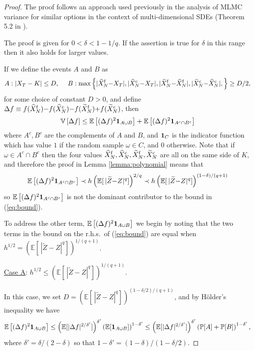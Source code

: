 \documentclass[11pt]{article}
\def \EE {{\mathbb{E}}}
\def \VV {{\mathbb{V}}}
\def \PP {{\mathbb{P}}}
\def \one {{\bf 1}}
\def \tZ {{\widetilde{Z}}}
\def \tXf  {{\widetilde{X}^{\rm f}}}
\def \tXc  {{\widetilde{X}^{\rm c}}}
\def \hXf {{\widehat{X}^{\rm f}}}
\def \hXc {{\widehat{X}^{\rm c}}}
\begin{document}
\begin{proof}
The proof follows an approach used previously in the analysis of MLMC variance
for similar options in the context of multi-dimensional SDEs (Theorem 5.2 in \cite{gs14}).

The proof is given for $0\!<\!\delta\!< 1{-}1/q$.  If the assertion 
is true for $\delta$ in this range then it also holds for larger values.

If we define the events $A$ and $B$ as
\[
A: | X_T - K | \leq D, ~~~~
B: \max\left\{
 |\hXf_N {-} X_T|,  |\hXc_N {-} X_T|,  |\tXf_N {-} \hXf_N|,  |\tXc_N {-} \hXc_N|, 
 \right\} \geq D/2,
\]
for some choice of constant $D\!>\!0$, and define
$\Delta f \equiv  f(\hXf_N) {-} f(\hXc_N) {-} f(\tXf_N) {+} f(\tXc_N)$, then
\[
\VV\left[ \Delta f \right] 
\leq \EE\left[ (\Delta f)^2 \one_{A\cup B} \right]
  +  \EE\left[ (\Delta f)^2 \one_{A^c\cap B^c} \right]
\]
where $A^c, B^c$ are the complements of $A$ and $B$, and $\one_C$ is the indicator function
which has value $1$ if the random sample $\omega\in C$, and 0 otherwise.
Note that if $\omega \!\in\! A^c\!\cap\! B^c$ then the four values 
$\hXf_N, \hXc_N, \tXf_N, \tXc_N$  are all on the same side of $K$, and therefore
the proof in Lemma \ref{lemma:polynomial} means that 
\begin{equation}
\EE\left[ (\Delta f)^2 \one_{A^c\cap B^c} \right]
\prec h \left(\EE[\, |\tZ{-}Z|^q]\right)^{2/q}
\prec h \left(\EE[\, |\tZ{-}Z|^q]\right)^{(1-\delta)/(q+1)}
\label{eq:bound1}
\end{equation}
so $\EE\left[ (\Delta f)^2 \one_{A^c\cap B^c} \right]$ is not the dominant
contributor to the bound in (\ref{eq:bound}).

To address the other term, $\EE\left[ (\Delta f)^2 \one_{A\cup B} \right]$
we begin by noting that the two terms in the bound on the r.h.s.~of
(\ref{eq:bound}) are equal when
$h^{1/2} = (\EE[\, |\tZ{-}Z|^q])^{1/(q+1)}$.

\vspace{0.2in}

\underline{Case A}: $h^{1/2} \leq (\EE[\, |\tZ{-}Z|^q])^{1/(q+1)}$.

In this case, we set $D\!=\!(\EE[\, |\tZ{-}Z|^q])^{(1-\delta/2)/(q+1)}$,
and by H\"older's inequality we have
\[
\EE\left[ (\Delta f)^2 \one_{A\cup B} \right]
\leq \left( \EE[ |\Delta f|^{2/\delta'}] \right)^{\delta'}
     \left( \EE[\one_{A\cup B}] \right)^{1-\delta'}
\leq \left( \EE[ |\Delta f|^{2/\delta'}] \right)^{\delta'}
     \left( \PP[A] + \PP[B] \right)^{1-\delta'},
\]
where $\delta'=\delta/(2{-}\delta)$ so that
$1{-}\delta'=(1{-}\delta)/(1{-}\delta/2)$.


\end{proof}
\end{document}
